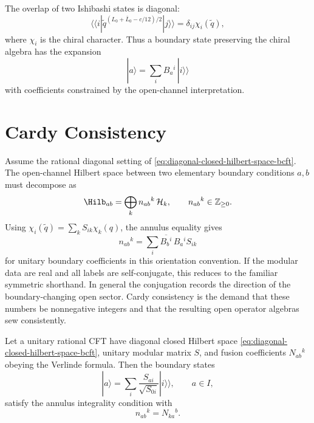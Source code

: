 The overlap of two Ishibashi states is diagonal:
\begin{equation}
  \langle\!\langle i|
  \tilde q^{(L_0+\bar L_0-c/12)/2}
  |j\rangle\!\rangle
  =
  \delta_{ij}\chi_i(\tilde q),
  \label{eq:ishibashi-overlap-character}
\end{equation}
where \(\chi_i\) is the chiral character.  Thus a boundary state preserving
the chiral algebra has the expansion
\begin{equation}
  |a\rangle=\sum_i B_a{}^i\,|i\rangle\!\rangle
  \label{eq:bcft-boundary-state-expansion}
\end{equation}
with coefficients constrained by the open-channel interpretation.

\section{Cardy Consistency}

Assume the rational diagonal setting of
\eqref{eq:diagonal-closed-hilbert-space-bcft}.  The open-channel Hilbert
space between two elementary boundary conditions \(a,b\) must decompose as
\begin{equation}
  \Hilb_{ab}
  =
  \bigoplus_k n_{ab}{}^k\,\mathcal H_k,
  \qquad
  n_{ab}{}^k\in\mathbb Z_{\ge0}.
  \label{eq:open-channel-hilbert-space-decomposition}
\end{equation}
Using \(\chi_i(\tilde q)=\sum_k S_{ik}\chi_k(q)\), the annulus equality gives
\begin{equation}
  n_{ab}{}^k
  =
  \sum_i \overline{B_b{}^i}\,B_a{}^i S_{ik}
  \label{eq:cardy-annulus-integrality-equation}
\end{equation}
for unitary boundary coefficients in this orientation convention.  If the
modular data are real and all labels are self-conjugate, this reduces to the
familiar symmetric shorthand.  In general the conjugation records the
direction of the boundary-changing open sector.
Cardy consistency is the demand that these numbers be nonnegative integers
and that the resulting open operator algebras sew consistently.

\begin{proposition}
\label{prop:oriented-cardy-annulus-diagonal}
Let a unitary rational CFT have diagonal closed Hilbert space
\eqref{eq:diagonal-closed-hilbert-space-bcft}, unitary modular matrix \(S\),
and fusion coefficients \(N_{ab}{}^k\) obeying the Verlinde formula.  Then
the boundary states
\begin{equation}
  |a\rangle
  =
  \sum_i
  \frac{S_{ai}}{\sqrt{S_{0i}}}
  |i\rangle\!\rangle,
  \qquad a\in I,
  \label{eq:cardy-state-diagonal}
\end{equation}
satisfy the annulus integrality condition with
\begin{equation}
  n_{ab}{}^k=N_{ka}{}^b .
  \label{eq:cardy-open-spectrum-fusion}
\end{equation}
\end{proposition}

